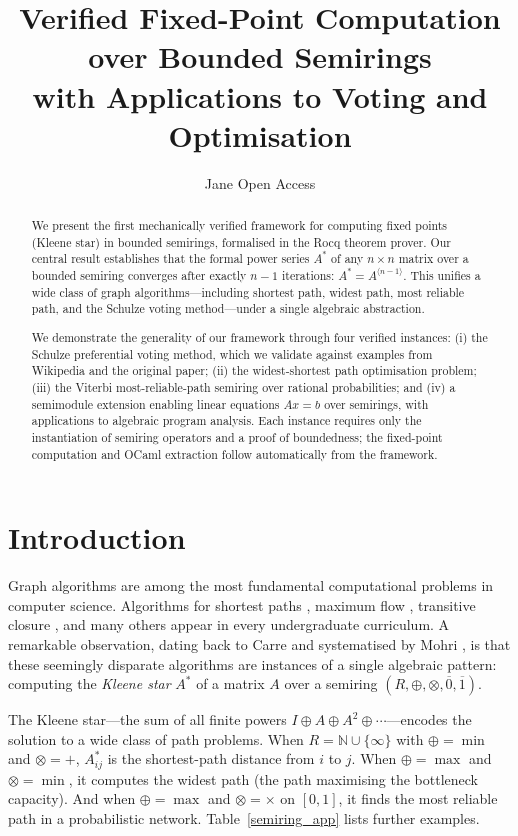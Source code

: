 \documentclass[a4paper,UKenglish,cleveref, autoref, thm-restate, anonymous]{lipics-v2021}
\title{Verified Fixed-Point Computation over Bounded Semirings\\with Applications to Voting and Optimisation} %
\author{Jane {Open Access}}{Dummy University Computing Laboratory, [optional: Address], Country \and My second affiliation, Country \and \url{http://www.myhomepage.edu} }{johnqpublic@dummyuni.org}{https://orcid.org/0000-0002-1825-0097}{(Optional) author-specific funding acknowledgements}%
\begin{document}
\nolinenumbers

\maketitle

\begin{abstract}
We present the first mechanically verified framework for computing fixed points (Kleene star) 
in bounded semirings, formalised in the Rocq theorem prover. Our central result establishes 
that the formal power series $A^*$ of any $n \times n$ matrix over a bounded semiring 
converges after exactly $n-1$ iterations: $A^* = A^{\langle n - 1 \rangle}$. This unifies 
a wide class of graph algorithms---including shortest path, widest path, most reliable path, 
and the Schulze voting method---under a single algebraic abstraction. 

We demonstrate the generality of our framework through four verified instances: 
(i) the Schulze preferential voting method, which we validate against examples from Wikipedia 
and the original paper; (ii) the widest-shortest path optimisation problem; 
(iii) the Viterbi most-reliable-path semiring over rational probabilities; and 
(iv) a semimodule extension enabling linear equations $Ax = b$ over semirings, 
with applications to algebraic program analysis. Each instance requires only 
the instantiation of semiring operators and a proof of boundedness; 
the fixed-point computation and OCaml extraction follow automatically from the framework.
\end{abstract}


\section{Introduction}
Graph algorithms are among the most fundamental computational
problems in computer science. Algorithms for shortest paths
\cite{10.1007/BF01386390}, maximum flow \cite{ford_fulkerson_1956},
transitive closure \cite{abdali1985transitive}, and many others
appear in every undergraduate curriculum. A remarkable observation,
dating back to Carre \cite{carre1971algebra} and systematised by
Mohri \cite{10.5555/639508.639512}, is that these seemingly disparate
algorithms are instances of a single algebraic pattern: computing the
\emph{Kleene star} $A^{*}$ of a matrix $A$ over a semiring
$(R, \oplus, \otimes, \overline{0}, \overline{1})$.

The Kleene star---the sum of all finite powers $I \oplus A \oplus A^2 \oplus \cdots$---encodes
the solution to a wide class of path problems. When $R = \mathbb{N} \cup \{\infty\}$
with $\oplus = \min$ and $\otimes = +$, $A^{*}_{ij}$ is the shortest-path
distance from $i$ to $j$. When $\oplus = \max$ and $\otimes = \min$,
it computes the widest path (the path maximising the bottleneck
capacity). And when $\oplus = \max$ and $\otimes = \times$ on $[0,1]$,
it finds the most reliable path in a probabilistic network.
Table~\ref{semiring_app} lists further examples.
\end{document}
